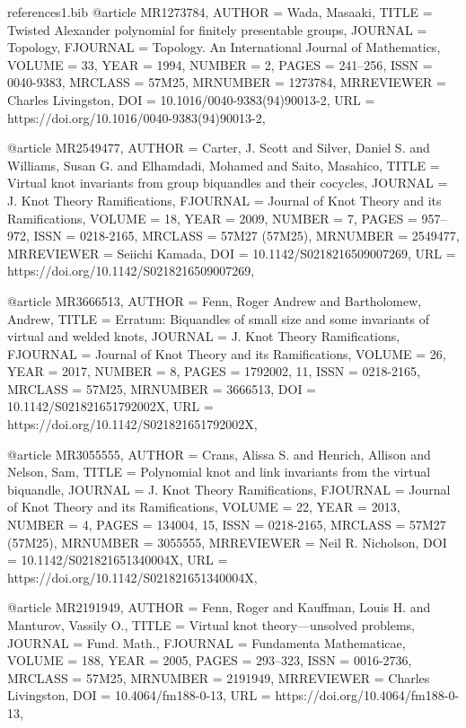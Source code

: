 \documentclass[11pt, reqno]{amsart}
\theoremstyle{definition}
\begin{document}
\begin{filecontents*}[overwrite]{references1.bib}
@article {MR1273784,
 AUTHOR = {Wada, Masaaki},
 TITLE = {Twisted {A}lexander polynomial for finitely presentable
  groups},
 JOURNAL = {Topology},
 FJOURNAL = {Topology. An International Journal of Mathematics},
 VOLUME = {33},
 YEAR = {1994},
 NUMBER = {2},
 PAGES = {241--256},
 ISSN = {0040-9383},
 MRCLASS = {57M25},
 MRNUMBER = {1273784},
 MRREVIEWER = {Charles Livingston},
 DOI = {10.1016/0040-9383(94)90013-2},
 URL = {https://doi.org/10.1016/0040-9383(94)90013-2},
}

@article {MR2549477,
 AUTHOR = {Carter, J. Scott and Silver, Daniel S. and Williams, Susan G.
  and Elhamdadi, Mohamed and Saito, Masahico},
 TITLE = {Virtual knot invariants from group biquandles and their
  cocycles},
 JOURNAL = {J. Knot Theory Ramifications},
 FJOURNAL = {Journal of Knot Theory and its Ramifications},
 VOLUME = {18},
 YEAR = {2009},
 NUMBER = {7},
 PAGES = {957--972},
 ISSN = {0218-2165},
 MRCLASS = {57M27 (57M25)},
 MRNUMBER = {2549477},
 MRREVIEWER = {Seiichi Kamada},
 DOI = {10.1142/S0218216509007269},
 URL = {https://doi.org/10.1142/S0218216509007269},
}

@article {MR3666513,
 AUTHOR = {Fenn, Roger Andrew and Bartholomew, Andrew},
 TITLE = {Erratum: {B}iquandles of small size and some invariants of
  virtual and welded knots},
 JOURNAL = {J. Knot Theory Ramifications},
 FJOURNAL = {Journal of Knot Theory and its Ramifications},
 VOLUME = {26},
 YEAR = {2017},
 NUMBER = {8},
 PAGES = {1792002, 11},
 ISSN = {0218-2165},
 MRCLASS = {57M25},
 MRNUMBER = {3666513},
 DOI = {10.1142/S021821651792002X},
 URL = {https://doi.org/10.1142/S021821651792002X},
}

@article {MR3055555,
 AUTHOR = {Crans, Alissa S. and Henrich, Allison and Nelson, Sam},
 TITLE = {Polynomial knot and link invariants from the virtual
  biquandle},
 JOURNAL = {J. Knot Theory Ramifications},
 FJOURNAL = {Journal of Knot Theory and its Ramifications},
 VOLUME = {22},
 YEAR = {2013},
 NUMBER = {4},
 PAGES = {134004, 15},
 ISSN = {0218-2165},
 MRCLASS = {57M27 (57M25)},
 MRNUMBER = {3055555},
 MRREVIEWER = {Neil R. Nicholson},
 DOI = {10.1142/S021821651340004X},
 URL = {https://doi.org/10.1142/S021821651340004X},
}

@article {MR2191949,
 AUTHOR = {Fenn, Roger and Kauffman, Louis H. and Manturov, Vassily O.},
 TITLE = {Virtual knot theory---unsolved problems},
 JOURNAL = {Fund. Math.},
 FJOURNAL = {Fundamenta Mathematicae},
 VOLUME = {188},
 YEAR = {2005},
 PAGES = {293--323},
 ISSN = {0016-2736},
 MRCLASS = {57M25},
 MRNUMBER = {2191949},
 MRREVIEWER = {Charles Livingston},
 DOI = {10.4064/fm188-0-13},
 URL = {https://doi.org/10.4064/fm188-0-13},
}


\end{filecontents*}
\end{document}
